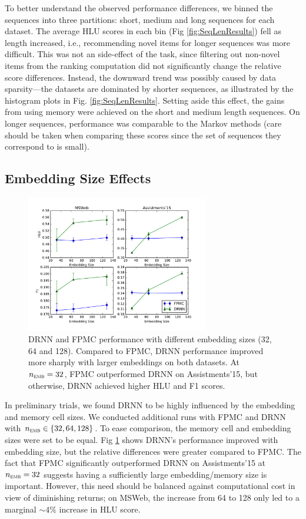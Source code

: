 \documentclass{sig-alternate-05-2015}
\begin{document}
To better understand the observed performance differences, we binned the sequences into three partitions: short, medium and long sequences for each dataset. The average HLU scores in each bin (Fig \ref{fig:SeqLenResults}) fell as length increased, i.e., recommending novel items for longer sequences was more difficult. This was not an side-effect of the task, since filtering out non-novel items from the ranking computation did not significantly change the relative score differences. Instead, the downward trend was possibly caused by data sparsity---the datasets are dominated by shorter sequences, as illustrated by the histogram plots in Fig. \ref{fig:SeqLenResults}. Setting aside this effect, the gains from using memory were achieved on the short and medium length sequences. On longer sequences, performance was comparable to the Markov methods (care should be taken when comparing these scores since the set of sequences they correspond to is small). 

\subsection{Embedding Size Effects}
\begin{figure}
\centering
\includegraphics[width=8cm]{images/EmbPerf}		
\caption{DRNN and FPMC performance with different embedding sizes (32, 64 and 128). Compared to FPMC, DRNN performance improved more sharply with larger embeddings on both datasets. At $n_\textsc{emb} = 32$, FPMC outperformed DRNN on Assistments'15, but otherwise, DRNN achieved  higher HLU and F1 scores.}
\label{fig:EmbResults}
\end{figure}
In preliminary trials, we found DRNN to be highly influenced by the embedding and memory cell sizes. We conducted additional runs with FPMC and DRNN with $n_\textsc{emb} \in \{ 32, 64, 128\}$. To ease comparison, the memory cell and embedding sizes were set to be equal. Fig \ref{fig:EmbResults} shows DRNN's performance improved with embedding size, but the relative differences were greater compared to FPMC. The fact that FPMC significantly outperformed DRNN on Assistments'15 at $n_\textsc{emb} = 32$ suggests having a sufficiently large embedding/memory size is important. However, this need should be balanced against computational cost in view of diminishing returns; on  MSWeb, the increase from 64 to 128 only led to a marginal $\sim 4\%$ increase in HLU score.
\end{document}
